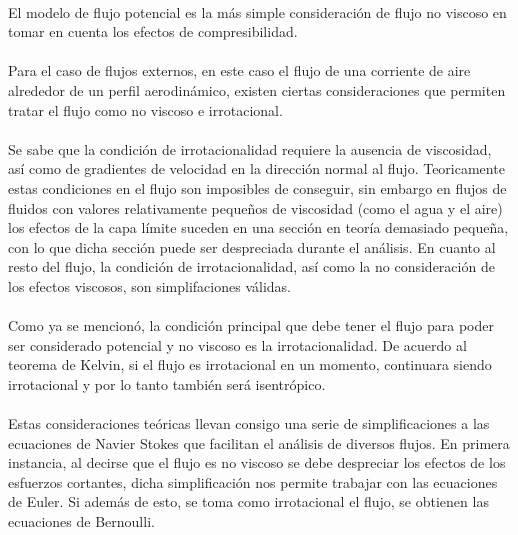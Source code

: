 \documentclass[letterpaper, openright, 12pt]{book}
\begin{document}
    \paragraph*{}
        El modelo de flujo potencial es la más simple consideración de flujo no
        viscoso en tomar en cuenta los efectos de compresibilidad.

    \paragraph*{}
        Para el caso de flujos externos, en este caso el flujo de una corriente
        de aire alrededor de un perfil aerodinámico, existen ciertas
        consideraciones que permiten tratar el flujo como no viscoso e
        irrotacional.

    \paragraph*{}
        Se sabe que la condición de irrotacionalidad requiere la ausencia de
        viscosidad, así como de gradientes de velocidad en la dirección normal
        al flujo. Teoricamente estas condiciones en el flujo son imposibles de
        conseguir, sin embargo en flujos de fluidos con valores relativamente
        pequeños de viscosidad (como el agua y el aire) los efectos de la capa
        límite suceden en una sección en teoría demasiado pequeña, con lo  que
        dicha sección puede ser despreciada durante el análisis. En cuanto al
        resto del flujo, la condición de irrotacionalidad, así como la no
        consideración de los efectos viscosos, son simplifaciones válidas.

    \paragraph*{}
        Como ya se mencionó, la condición principal que debe tener el flujo
        para poder ser considerado potencial y no viscoso es la
        irrotacionalidad. De acuerdo al teorema de Kelvin, si el flujo es
        irrotacional en un momento, continuara siendo irrotacional y por lo
        tanto también será isentrópico.

    \paragraph*{}
        Estas consideraciones teóricas llevan consigo una serie de
        simplificaciones a las ecuaciones de Navier Stokes que facilitan el
        análisis de diversos flujos. En primera instancia, al decirse que el
        flujo es no viscoso se debe despreciar los efectos de los esfuerzos
        cortantes, dicha simplificación nos permite trabajar con las ecuaciones
        de Euler. Si además de esto, se toma como irrotacional el flujo, se
        obtienen las ecuaciones de Bernoulli.
\end{document}
